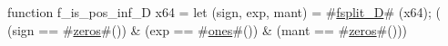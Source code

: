 function f_is_pos_inf_D   x64 = {
  let (sign, exp, mant) = #\hyperref[sailRISCVzfsplitzyD]{fsplit\_D}# (x64);
  (  (sign == #\hyperref[sailRISCVzzzeros]{zeros}#())
   & (exp  == #\hyperref[sailRISCVzones]{ones}#())
   & (mant == #\hyperref[sailRISCVzzzeros]{zeros}#()))
}
